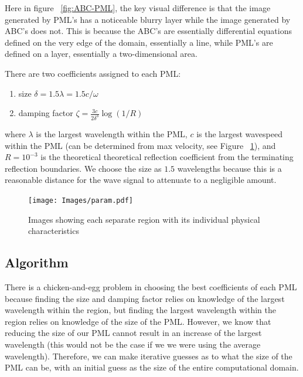Here in figure ~\ref{fig:ABC-PML}, the key visual difference is that the image generated by PML's has a noticeable blurry layer while the image generated by ABC's does not. This is because the ABC's are essentially differential equations defined on the very edge of the domain, essentially a line, while PML's are defined on a layer, essentially a two-dimensional area.


There are two coefficients assigned to each PML:
\begin{enumerate}
\item size $\delta = 1.5 \lambda = 1.5 c / \omega$
\item damping factor $\zeta = \frac{3c}{2\delta^3} \log(1/R)$
\end{enumerate}
where $\lambda$ is the largest wavelength within the PML, $c$ is the largest wavespeed within the PML (can be determined from max velocity, see Figure ~\ref{fig:physical-characteristics}), and $R = 10^{-3}$ is the theoretical theoretical reflection coefficient from the terminating reflection boundaries. We choose the size as $1.5$ wavelengths because this is a reasonable distance for the wave signal to attenuate to a negligible amount.

\begin{figure}[ht]
	\texttt{[image: Images/param.pdf]}
	\caption{Images showing each separate region with its individual physical characteristics \protect\footnotemark}
	\label{fig:physical-characteristics}
\end{figure}

\subsection{Algorithm}

There is a chicken-and-egg problem in choosing the best coefficients of each PML because finding the size and damping factor relies on knowledge of the largest wavelength within the region, but finding the largest wavelength within the region relies on knowledge of the size of the PML. However, we know that reducing the size of our PML cannot result in an increase of the largest wavelength (this would not be the case if we we were using the average wavelength). Therefore, we can make iterative guesses as to what the size of the PML can be, with an initial guess as the size of the entire computational domain.

